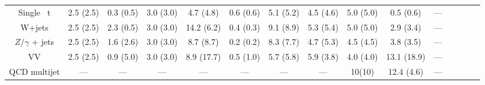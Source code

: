 \begin{table}
\begin{adjustbox}{max width=\textwidth}
\begin{tabular}{  c c c c c c c c c c c c c cc}
Single ~t & 2.5 (2.5) &  0.3 (0.5) &  3.0 (3.0) & 4.7 (4.8) &  0.6 (0.6) &  5.1 (5.2) &  4.5 (4.6) &  5.0 (5.0) & 0.5 (0.6) & --- \\ 
W+jets & 2.5 (2.5) &  2.3 (0.5) &  3.0 (3.0) & 14.2 (6.2) &  0.4 (0.3) &  9.1 (8.9) &  5.3 (5.4) &  5.0 (5.0) & 2.9 (3.4) & --- \\ 
$Z/\gamma$ + jets & 2.5 (2.5) &  1.6 (2.6) &  3.0 (3.0) & 8.7 (8.7) &  0.2 (0.2) &  8.3 (7.7) &  4.7 (5.3) &  4.5 (4.5) & 3.8 (3.5) & --- \\ 
VV & 2.5 (2.5) &  0.9 (5.0) &  3.0 (3.0) & 8.9 (17.7) &  0.5 (1.0) &  5.7 (5.8) &  5.9 (3.8) &  4.0 (4.0) & 13.1 (18.9) & --- \\ 
QCD multijet & --- &  --- &  --- & --- &  --- &  --- &  --- &  10(10) & 12.4 (4.6) & --- \\ 
\hline 
\end{tabular}
\end{adjustbox}
\end{table}

